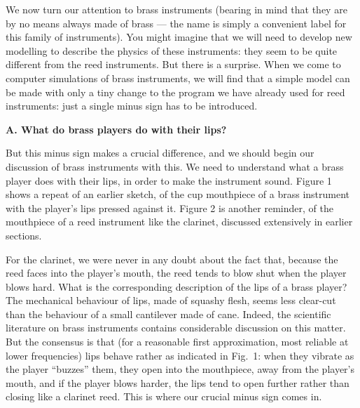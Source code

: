 

  We now turn our attention to brass instruments (bearing in mind that they are 
  by no means always made of brass — the name is simply a convenient label for 
  this family of instruments). You might imagine that we will need to develop 
  new modelling to describe the physics of these instruments: they seem to be 
  quite different from the reed instruments. But there is a surprise. When we 
  come to computer simulations of brass instruments, we will find that a simple 
  model can be made with only a tiny change to the program we have already used 
  for reed instruments: just a single minus sign has to be introduced. 

  \textbf{A. What do brass players do with their lips?} 

  But this minus sign makes a crucial difference, and we should begin our 
  discussion of brass instruments with this. We need to understand what a brass 
  player does with their lips, in order to make the instrument sound. Figure 1 
  shows a repeat of an earlier sketch, of the cup mouthpiece of a brass 
  instrument with the player’s lips pressed against it. Figure 2 is another 
  reminder, of the mouthpiece of a reed instrument like the clarinet, discussed 
  extensively in earlier sections. 



  For the clarinet, we were never in any doubt about the fact that, because the 
  reed faces into the player’s mouth, the reed tends to blow shut when the 
  player blows hard. What is the corresponding description of the lips of a 
  brass player? The mechanical behaviour of lips, made of squashy flesh, seems 
  less clear-cut than the behaviour of a small cantilever made of cane. Indeed, 
  the scientific literature on brass instruments contains considerable 
  discussion on this matter. But the consensus is that (for a reasonable first 
  approximation, most reliable at lower frequencies) lips behave rather as 
  indicated in Fig.\ 1: when they vibrate as the player ``buzzes'' them, they 
  open into the mouthpiece, away from the player’s mouth, and if the player 
  blows harder, the lips tend to open further rather than closing like a 
  clarinet reed. This is where our crucial minus sign comes in. 

